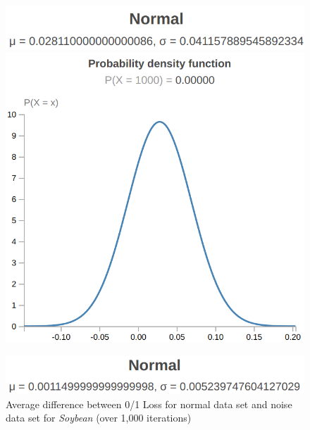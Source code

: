 \documentclass[twoside,11pt]{article}
\begin{document}
\begin{figure}[!hbp] %
    \centering
    \begin{minipage}[b]{0.3\textwidth}
        \includegraphics[width=\textwidth]{soybean-l-ms.png}
        \includegraphics[width=\textwidth]{soybean-l-df.png}
        \caption{Average difference between 0/1 Loss for normal data set and noise data set for \emph{Soybean} (over 1,000 iterations)}
    \end{minipage}
    \hfill
    \begin{minipage}[b]{0.3\textwidth}
        \includegraphics[width=\textwidth]{soybean-p-ms.png}

\end{minipage}
\end{figure}
\end{document}
